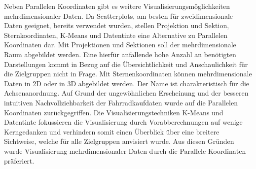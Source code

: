 \documentclass[usegeometry=true]{scrartcl}
\begin{document}
Neben Parallelen Koordinaten gibt es weitere Visualisierungsmöglichkeiten mehrdimensionaler Daten. Da Scatterplots, am besten für zweidimensionale Daten geeignet, bereits verwendet wurden, stellen Projektion und Sektion, Sternkoordinaten, K-Means und Datentinte eine Alternative zu Parallelen Koordinaten dar. Mit Projektionen und Sektionen soll der mehrdimensionale Raum abgebildet werden. Eine hierfür anfallende hohe Anzahl an benötigten Darstellungen kommt in Bezug auf die Übersichtlichkeit und Anschaulichkeit für die Zielgruppen nicht in Frage. Mit Sternenkoordinaten können mehrdimensionale Daten in 2D oder in 3D abgebildet werden. Der Name ist charakteristisch für die Achsenanordnung. Auf Grund der ungewöhnlichen Erscheinung und der besseren intuitiven Nachvollziehbarkeit der Fahrradkaufdaten wurde auf die Parallelen Koordinaten zurückgegriffen. Die Visualisierungstechniken K-Means und Datentinte fokussieren die Visualisierung durch Vorabberechnungen auf wenige Kerngedanken und verhindern somit einen Überblick über eine breitere Sichtweise, welche für alle Zielgruppen anvisiert wurde. Aus diesen Gründen wurde Visualisierung mehrdimensionaler Daten durch die Parallele Koordinaten präferiert. 
\end{document}

